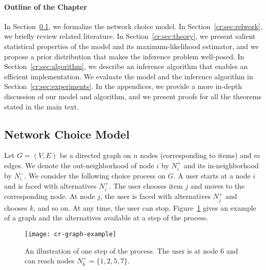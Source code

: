 \paragraph{Outline of the Chapter}
In Section~\ref{cr:sec:model}, we formalize the network choice model.
In Section~\ref{cr:sec:relwork}, we briefly review related literature.
In Section~\ref{cr:sec:theory}, we present salient statistical properties of the model and its maximum-likelihood estimator, and we propose a prior distribution that makes the inference problem well-posed.
In Section~\ref{cr:sec:algorithm}, we describe an inference algorithm that enables an efficient implementation.
We evaluate the model and the inference algorithm in Section~\ref{cr:sec:experiments}.
In the appendices, we provide a more in-depth discussion of our model and algorithm, and we present proofs for all the theorems stated in the main text.


\subsection{Network Choice Model}  %
\label{cr:sec:model}

Let $G = (V,E)$ be a directed graph on $n$ nodes (corresponding to items) and $m$ edges.
We denote the out-neighborhood of node $i$ by $N^+_i$ and its in-neighborhood by $N^-_i$.
We consider the following choice process on $G$.
A user starts at a node $i$ and is faced with alternatives $N^+_i$.
The user chooses item $j$ and moves to the corresponding node.
At node $j$, the user is faced with alternatives $N^+_j$ and chooses $k$, and so on.
At any time, the user can stop.
Figure~\ref{cr:fig:samplenet} gives an example of a graph and the alternatives available at a step of the process.

\begin{figure}[t]
  \centering
  \texttt{[image: cr-graph-example]}
  \caption{An illustration of one step of the process.
  The user is at node 6 and can reach nodes $N^+_6 = \{1, 2, 5, 7\}$.}
  \label{cr:fig:samplenet}
\end{figure}

